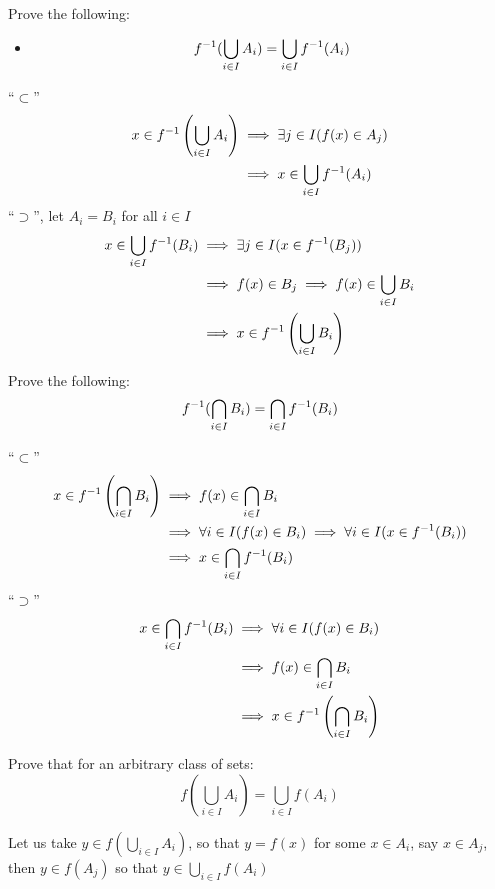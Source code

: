 \begin{exc}
	Prove the following:
	\begin{itemize}
		\item 
		\[ f^{-1}(\bigcup_{i \in I} A_i) = \bigcup_{i \in I}  f^{-1}(A_i)  \]
	\end{itemize}
\end{exc}
\begin{sol}
	``$ \subset $''
	\begin{align*}
	x \in f^{-1} \left( \bigcup_{i \in I} A_i \right) &\implies \exists j  \in I (f(x) \in A_j) \\
	&\implies x \in \bigcup_{i \in I} f^{-1}(A_i)
	\end{align*}
	``$ \supset $'', let $ A_i = B_i $ for all $ i \in I $
	\begin{align*}
	x \in \bigcup_{i \in I}f^{-1} (B_i) &\implies \exists j \in I (x \in f^{-1}(B_j)) \\
	&\implies f(x) \in B_j \implies f(x) \in \bigcup_{i \in I} B_i \\
	&\implies x \in f^{-1}\left( \bigcup_{i \in I} B_i \right)
	\end{align*}
\end{sol}
\begin{exc}
	Prove the following:
	\[ f^{-1}(\bigcap_{i \in I} B_i) = \bigcap_{i \in I} f^{-1}(B_i) \]
\end{exc}
\begin{sol}
	``$ \subset $''
	\begin{align*}
	x \in f^{-1}\left( \bigcap_{i \in I} B_i \right) &\implies f(x) \in \bigcap_{i \in I} B_i\\
	&\implies \forall i \in I ( f(x) \in B_i) \implies \forall i \in I (x \in  f^{-1}(B_i)) \\
	&\implies x \in \bigcap_{i \in I} f^{-1} (B_i)
	\end{align*}
	``$ \supset $''
	\begin{align*}
	x \in \bigcap_{i \in I} f^{-1}(B_i) &\implies \forall i \in I ( f(x) \in B_i) \\
	&\implies f(x) \in \bigcap_{i \in I} B_i \\
	&\implies x \in f^{-1}\left( \bigcap_{i \in I} B_i \right)
	\end{align*}
\end{sol}
\begin{exc}
	Prove that for an arbitrary class of sets:
	\[ f(\bigcup_{i \in I} A_i) = \bigcup_{i \in I} f(A_i) \]
\end{exc}
\begin{sol}
	Let us take $ y \in f(\bigcup_{i \in I} A_i) $, so that $ y = f(x)  $ for some $ x \in A_i $, say $ x \in A_j $, then $ y \in f(A_j) $ so that $  y \in \bigcup_{i \in I} f(A_i) $
\end{sol}
